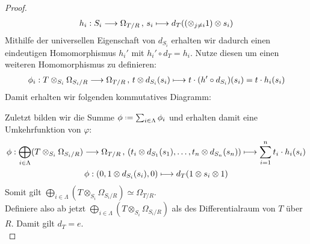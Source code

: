 \documentclass[10pt,a4paper]{report}
\newcommand{\functionback}[3]{\nolinebreak{#1:#2 \longmapsto #3}}
\newcommand{\function}[5]{\nolinebreak{#1:#2 \longrightarrow #3 \, , \, #4 \longmapsto #5}}
\newcommand{\divR}[2]{\Omega_{#1/#2}}
\newcommand{\divf}[1]{d_{#1}}
\newcommand{\Tensor}[3]{#1 \otimes_{#2} #3}
\newcommand{\tensor}[3]{#1 \otimes #3}
\newcommand*{\defeq}{\mathrel{\vcenter{\baselineskip0.5ex \lineskiplimit0pt
                     \hbox{\scriptsize.}\hbox{\scriptsize.}}}%
                     =}
\begin{document}
\begin{proof}
\begin{gather*}
\function{h_i}{S_i}{\divR{T}{R}}{s_i}{\divf{T}(\tensor{(\otimes_{j \neq i} 1)}{R}{s_i})}
\end{gather*}
Mithilfe der universellen Eigenschaft von $\divf{S_i}$ erhalten wir dadurch einen eindeutigen Homomorphismus $h_i'$ mit $h_i' \circ \divf{T} = h_i$. Nutze diesen um einen weiteren Homomorphismus zu definieren:
\begin{gather*}
\function{\phi_i}{\Tensor{T}{S_i}{\divR{S_i}{R}}}{\divR{T}{R}}{\tensor{t}{S_i}{\divf{S_i}(s_i)}}{t \cdot (h' \circ \divf{S_i})(s_i) = t \cdot h_i(s_i)}
\end{gather*}
Damit erhalten wir folgenden kommutatives Diagramm:
\begin{center}
\end{center}
Zuletzt bilden wir die Summe $\phi \defeq \sum_{i \in \Lambda} \phi_i$ und erhalten damit eine Umkehrfunktion von $\varphi$:
\begin{gather*}
\function{\phi}{\bigoplus_{i\in \Lambda} ( \Tensor{T}{S_i}{\divR{S_i}{R}})}{\divR{T}{R}}{(\tensor{t_i}{S_1}{\divf{S_1}(s_1)},\dots,\tensor{t_n}{S_n}{\divf{S_n}(s_n)})}{\sum_{i = 1}^n t_i \cdot h_i(s_i)}\\
\functionback{\phi}{(0,\tensor{1}{S_i}{d_{S_i}(s_i)},0)}{\divf{T}(1 \otimes s_i \otimes 1)}
\end{gather*}
Somit gilt $\bigoplus_{i\in \Lambda} ( \Tensor{T}{S_i}{\divR{S_i}{R}}) \simeq \divR{T}{R}$.\\
Definiere also ab jetzt $\bigoplus_{i\in \Lambda} (\Tensor{T}{S_i}{\divR{S_i}{R}})$ als des Differentialraum von $T$ über $R$. Damit gilt $\divf{T} = e$.\\
\end{proof}
\end{document}
